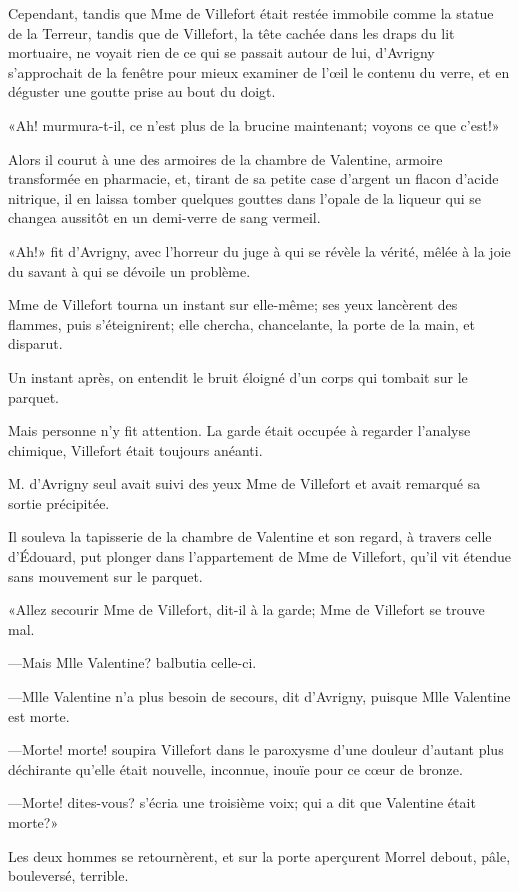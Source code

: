 Cependant, tandis que Mme de Villefort était restée immobile comme la statue de la Terreur, tandis que de Villefort, la tête cachée dans les draps du lit mortuaire, ne voyait rien de ce qui se passait autour de lui, d'Avrigny s'approchait de la fenêtre pour mieux examiner de l'œil le contenu du verre, et en déguster une goutte prise au bout du doigt. 

«Ah! murmura-t-il, ce n'est plus de la brucine maintenant; voyons ce que c'est!» 

Alors il courut à une des armoires de la chambre de Valentine, armoire transformée en pharmacie, et, tirant de sa petite case d'argent un flacon d'acide nitrique, il en laissa tomber quelques gouttes dans l'opale de la liqueur qui se changea aussitôt en un demi-verre de sang vermeil. 

«Ah!» fit d'Avrigny, avec l'horreur du juge à qui se révèle la vérité, mêlée à la joie du savant à qui se dévoile un problème. 

Mme de Villefort tourna un instant sur elle-même; ses yeux lancèrent des flammes, puis s'éteignirent; elle chercha, chancelante, la porte de la main, et disparut. 

Un instant après, on entendit le bruit éloigné d'un corps qui tombait sur le parquet. 

Mais personne n'y fit attention. La garde était occupée à regarder l'analyse chimique, Villefort était toujours anéanti. 

M. d'Avrigny seul avait suivi des yeux Mme de Villefort et avait remarqué sa sortie précipitée. 

Il souleva la tapisserie de la chambre de Valentine et son regard, à travers celle d'Édouard, put plonger dans l'appartement de Mme de Villefort, qu'il vit étendue sans mouvement sur le parquet. 

«Allez secourir Mme de Villefort, dit-il à la garde; Mme de Villefort se trouve mal. 

—Mais Mlle Valentine? balbutia celle-ci. 

—Mlle Valentine n'a plus besoin de secours, dit d'Avrigny, puisque Mlle Valentine est morte. 

—Morte! morte! soupira Villefort dans le paroxysme d'une douleur d'autant plus déchirante qu'elle était nouvelle, inconnue, inouïe pour ce cœur de bronze. 

—Morte! dites-vous? s'écria une troisième voix; qui a dit que Valentine était morte?» 

Les deux hommes se retournèrent, et sur la porte aperçurent Morrel debout, pâle, bouleversé, terrible. 

